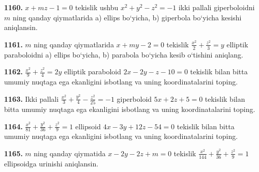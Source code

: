 \textbf{1160.} $x+m z-1=0$ tekislik ushbu $x^2+y^2-z^2=-1$ ikki pallali giperboloidni $m$ ning qanday qiymatlarida a) ellips bo‘yicha, b) giperbola bo‘yicha kesishi aniqlansin.

\textbf{1161.} $m$ ning qanday qiymatlarida $x+m y-2=0$ tekislik $\frac{x^2}{2}+\frac{z^2}{3}=y$ elliptik paraboloidni a) ellips bo‘yicha, b) parabola bo‘yicha kesib o‘tishini aniqlang.

\textbf{1162.} $\frac{x^2}{9}+\frac{z^2}{4}=2 y$ elliptik paraboloid $2 x-2 y-z-10=0$ tekislik bilan bitta umumiy nuqtaga ega ekanligini isbotlang va uning koordinatalarini toping.

\textbf{1163.} Ikki pallali $\frac{x^2}{3}+\frac{y^2}{4}-\frac{z^2}{25}=-1$ giperboloid $5 x+2 z+5=0$ tekislik bilan bitta umumiy nuqtaga ega ekanligini isbotlang va uning koordinatalarini toping.

\textbf{1164.} $\frac{x^2}{81}+\frac{y^2}{36}+\frac{z^2}{9}=1$ ellipsoid $4 x-3 y+12 z-54=0$ tekislik bilan bitta umumiy nuqtaga ega ekanligini isbotlang va uning koordinatalarini toping.

\textbf{1165.} $m$ ning qanday qiymatida $x-2 y-2 z+m=0$ tekislik $\frac{x^2}{144}+\frac{y^2}{36}+\frac{z^2}{9}=1$ ellipsoidga urinishi aniqlansin.